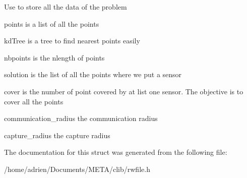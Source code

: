 Use to store all the data of the problem
\begin{DoxyItemize}
\item points is a list of all the points
\item kd\+Tree is a tree to find nearest points easily
\item nbpoints is the nlength of points
\item solution is the list of all the points where we put a sensor
\item cover is the number of point covered by at list one sensor. The objective is to cover all the points
\item communication\+\_\+radius the communication radius
\item capture\+\_\+radius the capture radius 
\end{DoxyItemize}

The documentation for this struct was generated from the following file\+:\begin{DoxyCompactItemize}
\item 
/home/adrien/\+Documents/\+M\+E\+T\+A/clib/rwfile.\+h\end{DoxyCompactItemize}
